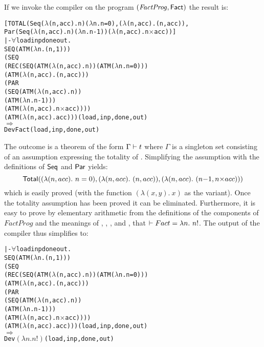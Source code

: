 \documentclass{llncs}
\begin{document}
If we invoke the compiler on the program $(\mathit{FactProg},\mathsf{Fact})$ the result
is:

{\small\begin{alltt}
[ TOTAL (Seq (\(\lambda\)(n,acc). n) (\(\lambda\)n. n = 0), (\(\lambda\)(n,acc). (n,acc)),
         Par (Seq (\(\lambda\)(n,acc). n) (\(\lambda\)n. n-1)) (\(\lambda\)(n,acc). n\(\times\)acc)) ]
    |- \(\forall\)load inp done out.
         SEQ (ATM (\(\lambda\)n. (n,1)))
           (SEQ
              (REC (SEQ (ATM (\(\lambda\)(n,acc). n)) (ATM (\(\lambda\)n. n = 0)))
                 (ATM (\(\lambda\)(n,acc). (n,acc)))
                 (PAR
                    (SEQ (ATM (\(\lambda\)(n,acc). n))
                       (ATM (\(\lambda\)n. n-1)))
                    (ATM (\(\lambda\)(n,acc). n\(\times\)acc))))
              (ATM (\(\lambda\)(n,acc). acc))) (load,inp,done,out) 
         \(\Rightarrow\)
         Dev Fact (load,inp,done,out)
\end{alltt}}

The outcome is a theorem of the form $\Gamma\vdash t$ where $\Gamma$
is a singleton set consisting of an assumption expressing the totality
of . Simplifying the assumption with the definitions of
$\mathsf{Seq}$ and $\mathsf{Par}$ yields:
\[
\mathsf{Total}((\lambda (n,acc).~n=0),(\lambda (n,acc).~(n,acc)), (\lambda (n,acc).~(n{-}1,n{\times}acc)))
\]
which is easily proved (with the function $(\lambda
(x,y).~x)$ as the variant).  Once the totality assumption has been proved it can be
eliminated. Furthermore, it is easy to prove by elementary arithmetic from the definitions of the
components of $FactProg$ and the meanings of , , ,  and , that
$\vdash Fact = \lambda n.~n!$. The output of the compiler thus simplifies to:

\newpage

{\small\begin{alltt}
 |- \(\forall\)load inp done out.
         SEQ (ATM (\(\lambda\)n. (n,1)))
           (SEQ
              (REC (SEQ (ATM (\(\lambda\)(n,acc). n)) (ATM (\(\lambda\)n. n = 0)))
                 (ATM (\(\lambda\)(n,acc). (n,acc)))
                 (PAR
                    (SEQ (ATM (\(\lambda\)(n,acc). n))
                       (ATM (\(\lambda\)n. n-1)))
                    (ATM (\(\lambda\)(n,acc). n\(\times\)acc))))
              (ATM (\(\lambda\)(n,acc). acc))) (load,inp,done,out)
         \(\Rightarrow\)
         Dev \(({\lambda}n. n!)\) (load,inp,done,out)
\end{alltt}}
\end{document}
